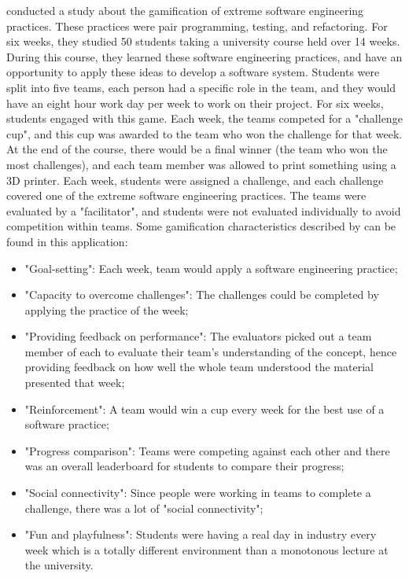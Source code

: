 \documentclass{l4proj}
\begin{document}
\citet{akpolat_enhancing_2014} conducted a study about the gamification of extreme software engineering practices. These practices were pair programming, testing, and refactoring.
For six weeks, they studied 50 students taking a university course held over 14 weeks. During this course, they learned these software engineering practices,
and have an opportunity to apply these ideas to develop a software system. Students were split into five teams, each person had a specific role in the team,
and they would have an eight hour work day per week to work on their project. For six weeks, students engaged with this game. Each week, the teams competed for a "challenge cup", 
and this cup was awarded to the team who won the challenge for that week. At the end of the course, there would be a final winner (the team who won the most challenges),
and each team member was allowed to print something using a 3D printer. Each week, students were assigned a challenge, 
and each challenge covered one of the extreme software engineering practices. The teams were evaluated by a "facilitator", 
and students were not evaluated individually to avoid competition within teams.
Some gamification characteristics described by \citet{cugelman_gamification:_2013} can be found in this application:
\begin{itemize}
    \item "Goal-setting": Each week, team would apply a software engineering practice;
    \item "Capacity to overcome challenges": The challenges could be completed by applying the practice of the week;
    \item "Providing feedback on performance": The evaluators picked out a team member of each to evaluate their team's understanding of the concept, 
    hence providing feedback on how well the whole team understood the material presented that week;
    \item "Reinforcement": A team would win a cup every week for the best use of a software practice;
    \item "Progress comparison": Teams were competing against each other and there was an overall leaderboard for students to compare their progress;
    \item "Social connectivity": Since people were working in teams to complete a challenge, there was a lot of "social connectivity";
    \item "Fun and playfulness": Students were having a real day in industry every week which is a totally different environment than a monotonous lecture at the university. 
\end{itemize}
\end{document}
